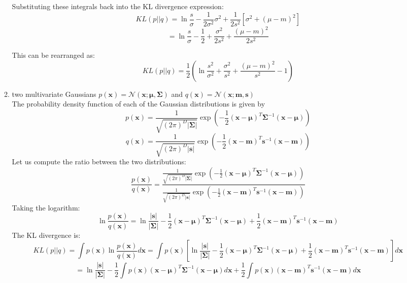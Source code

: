 \documentclass{article}
\begin{document}
\begin{enumerate}
\begin{enumerate}
Substituting these integrals back into the KL divergence expression:
\[
KL(p||q) = \ln\frac{s}{\sigma} - \frac{1}{2\sigma^2}\sigma^2 + \frac{1}{2s^2}[\sigma^2 + (\mu - m)^2]
\]
\[
= \ln\frac{s}{\sigma} - \frac{1}{2} + \frac{\sigma^2}{2s^2} + \frac{(\mu - m)^2}{2s^2}
\]

This can be rearranged as:
\[
KL(p||q) = \frac{1}{2}\left(\ln\frac{s^2}{\sigma^2} + \frac{\sigma^2}{s^2} + \frac{(\mu - m)^2}{s^2} - 1\right)
\]

\item two multivariate Gaussians
$p(\mathbf{x}) = \mathcal{N}(\mathbf{x}; \boldsymbol{\mu}, \boldsymbol{\Sigma})$ and $q(\mathbf{x}) = \mathcal{N}(\mathbf{x}; \mathbf{m}, \mathbf{s})$
\\ The probability density function of each of the Gaussian distributions is given by
\[
p(\mathbf{x}) = \frac{1}{\sqrt{(2\pi)^D |\boldsymbol{\Sigma}|}} \exp\left(-\frac{1}{2}(\mathbf{x} - \boldsymbol{\mu})^T \boldsymbol{\Sigma}^{-1} (\mathbf{x} - \boldsymbol{\mu})\right)
\]
\[
q(\mathbf{x}) = \frac{1}{\sqrt{(2\pi)^D |\mathbf{s}|}} \exp\left(-\frac{1}{2}(\mathbf{x} - \mathbf{m})^T \mathbf{s}^{-1} (\mathbf{x} - \mathbf{m})\right)
\]
Let us compute the ratio between the two distributions:
\[
\frac{p(\mathbf{x})}{q(\mathbf{x})} = \frac{\frac{1}{\sqrt{(2\pi)^D |\boldsymbol{\Sigma}|}} \exp\left(-\frac{1}{2}(\mathbf{x} - \boldsymbol{\mu})^T \boldsymbol{\Sigma}^{-1} (\mathbf{x} - \boldsymbol{\mu})\right)}{\frac{1}{\sqrt{(2\pi)^D |\mathbf{s}|}} \exp\left(-\frac{1}{2}(\mathbf{x} - \mathbf{m})^T \mathbf{s}^{-1} (\mathbf{x} - \mathbf{m})\right)}
\]
Taking the logarithm:
\[
\ln \frac{p(\mathbf{x})}{q(\mathbf{x})} = \ln\frac{|\mathbf{s}|}{|\boldsymbol{\Sigma}|} - \frac{1}{2}(\mathbf{x} - \boldsymbol{\mu})^T \boldsymbol{\Sigma}^{-1} (\mathbf{x} - \boldsymbol{\mu}) + \frac{1}{2}(\mathbf{x} - \mathbf{m})^T \mathbf{s}^{-1} (\mathbf{x} - \mathbf{m})
\]
The KL divergence is:
\[
KL(p||q) = \int p(\mathbf{x}) \ln \frac{p(\mathbf{x})}{q(\mathbf{x})} d\mathbf{x} = \int p(\mathbf{x}) \left[\ln\frac{|\mathbf{s}|}{|\boldsymbol{\Sigma}|} - \frac{1}{2}(\mathbf{x} - \boldsymbol{\mu})^T \boldsymbol{\Sigma}^{-1} (\mathbf{x} - \boldsymbol{\mu}) + \frac{1}{2}(\mathbf{x} - \mathbf{m})^T \mathbf{s}^{-1} (\mathbf{x} - \mathbf{m})\right] d\mathbf{x}
\]
\[
= \ln\frac{|\mathbf{s}|}{|\boldsymbol{\Sigma}|} - \frac{1}{2}\int p(\mathbf{x})(\mathbf{x} - \boldsymbol{\mu})^T \boldsymbol{\Sigma}^{-1} (\mathbf{x} - \boldsymbol{\mu}) d\mathbf{x} + \frac{1}{2}\int p(\mathbf{x})(\mathbf{x} - \mathbf{m})^T \mathbf{s}^{-1} (\mathbf{x} - \mathbf{m}) d\mathbf{x}
\]
\end{enumerate}
\end{enumerate}
\end{document}
